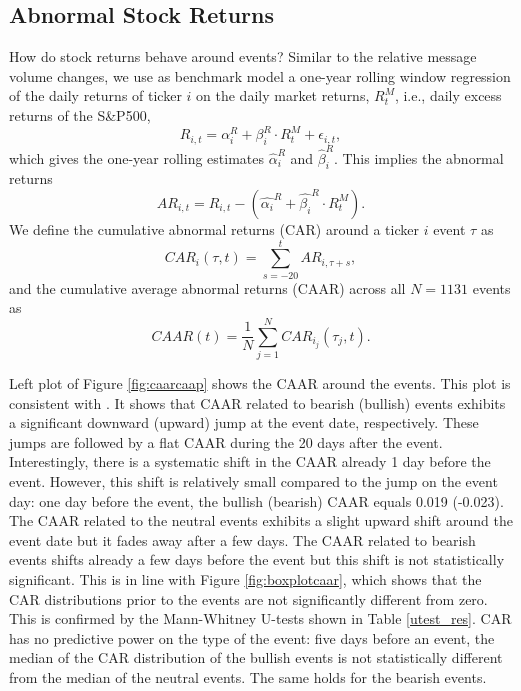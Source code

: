 \subsection{Abnormal Stock Returns}
How do stock returns behave around events? Similar to the relative message volume changes, we use as benchmark model a one-year rolling window regression of the daily returns of ticker $i$ on the daily market returns, $R^M_{t}$, i.e., daily excess returns of the S\&P500,
\begin{equation}
    R_{i,t}= \alpha_i^R  + \beta_i^R \cdot R_t^M  + \epsilon_{i,t},
\end{equation}
which gives the one-year rolling estimates $\hat{\alpha}_i^R$ and $\hat{\beta}_i^R$. This implies the abnormal returns 
\begin{equation}
    AR_{i,t} = R_{i,t} - \left(\hat{\alpha_i}^R + \hat{\beta_i}^R \cdot R_t^M\right).
\end{equation}
We define the cumulative abnormal returns (CAR) around a ticker $i$ event $\tau$ as 
\begin{equation}
    CAR_i(\tau,t) = \sum_{s=- 20}^{t} AR_{i,\tau + s},
\end{equation}
and the cumulative average abnormal returns (CAAR) across all $N=1131$ events as 
\begin{equation}
         CAAR(t) = \dfrac{1}{N} \sum_{j=1}^N CAR_{i_j}(\tau_j,t).
\end{equation}
 
Left plot of Figure \ref{fig:caarcaap} shows the CAAR around the events. This plot is consistent with \citet{mackinlay1997event}. It shows that CAAR related to bearish (bullish) events exhibits a significant downward (upward) jump at the event date, respectively. These jumps are followed by a flat CAAR during the 20 days after the event. Interestingly, there is a systematic shift in the CAAR already 1 day before the event. However, this shift is relatively small compared to the jump on the event day: one day before the event, the bullish (bearish) CAAR equals 0.019 (-0.023). The CAAR related to the neutral events exhibits a slight upward shift around the event date but it fades away after a few days. The CAAR related to bearish events shifts already a few days before the event but this shift is not statistically significant. This is in line with Figure \ref{fig:boxplotcaar}, which shows that the CAR distributions prior to the events are not significantly different from zero. This is confirmed by the Mann-Whitney U-tests shown in Table \ref{utest_res}. CAR has no predictive power on the type of the event: five days before an event, the median of the CAR distribution of the bullish events is not statistically different from the median of the neutral events. The same holds for the bearish events.

